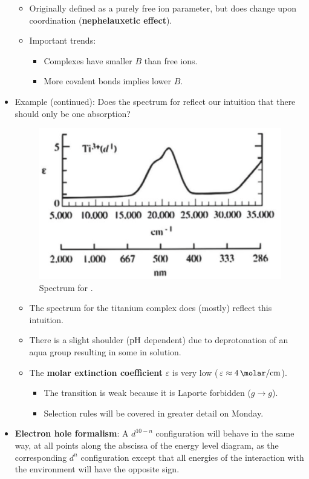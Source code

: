 \documentclass[../notes.tex]{subfiles}
\begin{document}
\begin{itemize}
\begin{itemize}
        \item Originally defined as a purely free ion parameter, but does change upon coordination (\textbf{nephelauxetic effect}).
        \item Important trends:
        \begin{itemize}
            \item Complexes have smaller $B$ than free ions.
            \item More covalent  bonds implies lower $B$.
        \end{itemize}
    \end{itemize}
    \item Example (continued): Does the spectrum for  reflect our intuition that there should only be one absorption?
    \begin{figure}[h!]
        \centering
        \includegraphics[width=0.35\linewidth]{../ExtFiles/spectrumTi3.png}
        \caption{Spectrum for .}
        \label{fig:spectrumTi3}
    \end{figure}
    \begin{itemize}
        \item The spectrum for the titanium complex does (mostly) reflect this intuition.
        \item There is a slight shoulder ($\operatorname{pH}$ dependent) due to deprotonation of an aqua group resulting in some  in solution.
        \item The \textbf{molar extinction coefficient} $\varepsilon$ is very low ($\varepsilon\approx\SI{4}{\per\molar\per\centi\meter}$).
        \begin{itemize}
            \item The transition is weak because it is Laporte forbidden ($g\to g$).
            \item Selection rules will be covered in greater detail on Monday.
        \end{itemize}
    \end{itemize}
    \item \textbf{Electron hole formalism}: A $d^{10-n}$ configuration will behave in the same way, at all points along the abscissa of the energy level diagram, as the corresponding $d^n$ configuration except that all energies of the interaction with the environment will have the opposite sign.

\end{itemize}
\end{document}
